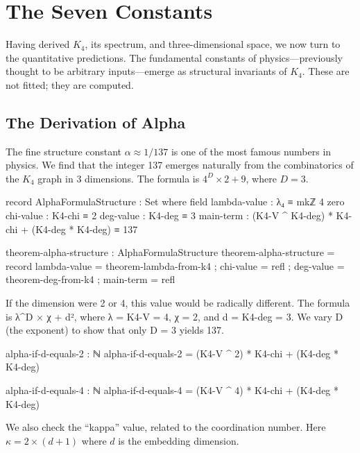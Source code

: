 \documentclass[11pt,a4paper]{book}
\begin{document}
\chapter{The Seven Constants}
\label{chap:physical-constants}

Having derived $K_4$, its spectrum, and three-dimensional space, we now turn to the 
quantitative predictions. The fundamental constants of physics—previously thought to be 
arbitrary inputs—emerge as structural invariants of $K_4$. These are not fitted; they 
are computed.

\section{The Derivation of Alpha}

The fine structure constant $\alpha \approx 1/137$ is one of the most famous numbers in physics. We find that the integer 137 emerges naturally from the combinatorics of the $K_4$ graph in 3 dimensions. The formula is $4^D \times 2 + 9$, where $D=3$.

\begin{code}
record AlphaFormulaStructure : Set where
  field
    lambda-value : λ₄ ≡ mkℤ 4 zero
    chi-value    : K4-chi ≡ 2
    deg-value    : K4-deg ≡ 3
    main-term    : (K4-V ^ K4-deg) * K4-chi + (K4-deg * K4-deg) ≡ 137

theorem-alpha-structure : AlphaFormulaStructure
theorem-alpha-structure = record
  { lambda-value = theorem-lambda-from-k4
  ; chi-value = refl
  ; deg-value = theorem-deg-from-k4
  ; main-term = refl
  }
\end{code}

If the dimension were 2 or 4, this value would be radically different.
The formula is λ^D × χ + d², where λ = K4-V = 4, χ = 2, and d = K4-deg = 3.
We vary D (the exponent) to show that only D = 3 yields 137.

\begin{code}
alpha-if-d-equals-2 : ℕ
alpha-if-d-equals-2 = (K4-V ^ 2) * K4-chi + (K4-deg * K4-deg)

alpha-if-d-equals-4 : ℕ
alpha-if-d-equals-4 = (K4-V ^ 4) * K4-chi + (K4-deg * K4-deg)

\end{code}

We also check the ``kappa'' value, related to the coordination number.
Here $\kappa = 2 \times (d + 1)$ where $d$ is the embedding dimension.
\end{document}

